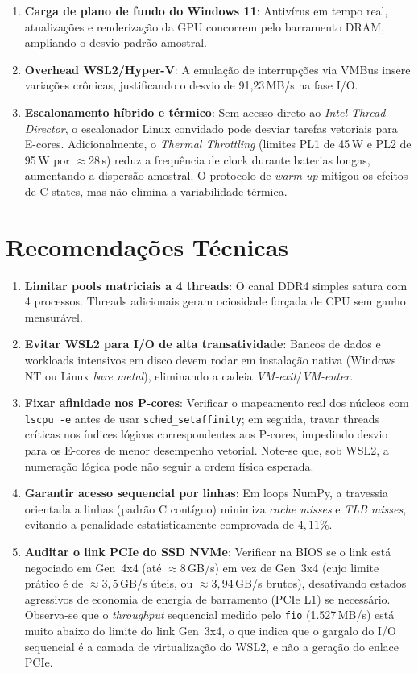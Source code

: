 \documentclass[
	12pt,
	openright,
	oneside,
	a4paper,
	english,
	brazil
	]{abntex2}
\begin{document}
\begin{enumerate}
    \item \textbf{Carga de plano de fundo do Windows 11}: Antivírus em tempo real, atualizações e renderização da GPU concorrem pelo barramento DRAM, ampliando o desvio-padrão amostral.
    \item \textbf{Overhead WSL2/Hyper-V}: A emulação de interrupções via VMBus insere variações crônicas, justificando o desvio de 91,23\,MB/s na fase I/O.
    \item \textbf{Escalonamento híbrido e térmico}: Sem acesso direto ao \textit{Intel Thread Director}, o escalonador Linux convidado pode desviar tarefas vetoriais para E-cores. Adicionalmente, o \textit{Thermal Throttling} (limites PL1 de 45\,W e PL2 de 95\,W por $\approx$28\,s) reduz a frequência de clock durante baterias longas, aumentando a dispersão amostral. O protocolo de \textit{warm-up} mitigou os efeitos de C-states, mas não elimina a variabilidade térmica.
\end{enumerate}

\section{Recomendações Técnicas}
\label{sec:recomendacoes}

\begin{enumerate}
    \item \textbf{Limitar pools matriciais a 4 threads}: O canal DDR4 simples satura com 4 processos. Threads adicionais geram ociosidade forçada de CPU sem ganho mensurável.
    \item \textbf{Evitar WSL2 para I/O de alta transatividade}: Bancos de dados e workloads intensivos em disco devem rodar em instalação nativa (Windows NT ou Linux \textit{bare metal}), eliminando a cadeia \textit{VM-exit}/\textit{VM-enter}.
    \item \textbf{Fixar afinidade nos P-cores}: Verificar o mapeamento real dos núcleos com \texttt{lscpu -e} antes de usar \texttt{sched\_setaffinity}; em seguida, travar threads críticas nos índices lógicos correspondentes aos P-cores, impedindo desvio para os E-cores de menor desempenho vetorial. Note-se que, sob WSL2, a numeração lógica pode não seguir a ordem física esperada.
    \item \textbf{Garantir acesso sequencial por linhas}: Em loops NumPy, a travessia orientada a linhas (padrão C contíguo) minimiza \textit{cache misses} e \textit{TLB misses}, evitando a penalidade estatisticamente comprovada de $4{,}11\%$.
    \item \textbf{Auditar o link PCIe do SSD NVMe}: Verificar na BIOS se o link está negociado em Gen~4x4 (até $\approx 8$\,GB/s) em vez de Gen~3x4 (cujo limite prático é de $\approx 3{,}5$\,GB/s úteis, ou $\approx 3{,}94$\,GB/s brutos), desativando estados agressivos de economia de energia de barramento (PCIe L1) se necessário. Observa-se que o \textit{throughput} sequencial medido pelo \texttt{fio} (1.527\,MB/s) está muito abaixo do limite do link Gen~3x4, o que indica que o gargalo do I/O sequencial é a camada de virtualização do WSL2, e não a geração do enlace PCIe.
\end{enumerate}
\end{document}
